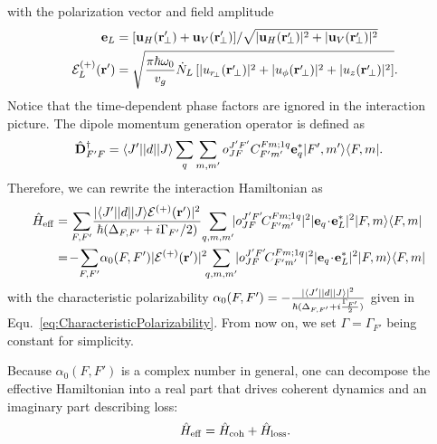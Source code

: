 with the polarization vector and field amplitude 
\begin{align}
\mathbf{e}_L &= [\mathbf{u}_H(\br'\!\!_\perp)+\mathbf{u}_V(\br'\!\!_\perp)]/\sqrt{|\mathbf{u}_H(\br'\!\!_\perp)|^2+|\mathbf{u}_V(\br'\!\!_\perp)|^2} \\
\mathcal{E}_L^{(+)} (\br') &= \sqrt{\frac{{\pi}\hbar\omega_0}{v_g}\dot{N}_L \left[ |u_{r\!_\perp}(\br'\!_\perp)|^2 + |u_\phi(\br'\!_\perp)|^2 +|u_z(\br'\!_\perp)|^2 \right]}.
\end{align}
Notice that the time-dependent phase factors are ignored in the interaction picture. 
The dipole momentum generation operator is defined as
\begin{align}
\hat{\mathbf{D}}_{F'F}^{\dagger} &= \langle{J'}\rvert| d |\lvert{J}\rangle\sum_{q}\sum_{m,m'} o^{J'F'}_{JF} C^{F m;1q}_{F' m'} \mathbf{e}_q^* \lvert{F',m'}\rangle\langle{F,m}\rvert.
\end{align}
Therefore, we can rewrite the interaction Hamiltonian as
\begin{align}
\!\!\!\!\!\!\hat{H}_{\rm eff} &= \sum_{F,F'} \! \frac{ |\bra{J'}| d |\ket{J} \mathcal{E}^{(+)}(\br')|^2}{\hbar(\Delta_{F,F'}+i\Gamma_{F'}/2)}\! \sum_{q,m,m'}\!\! |o^{J'F'}_{JF}\! C^{F m;1q}_{F' m'} |^2 |\mathbf{e}_q\!\cdot\! \mathbf{e}_L^*|^2\op{F,m}{F,m} \\
&= \!-\! \sum_{F,F'} \! \alpha_0(F,F')|\mathcal{E}^{(+)}(\br')|^2\!\! \sum_{q,m,m'}\!\! |o^{J'F'}_{JF}\! C^{F m;1q}_{F' m'} |^2 |\mathbf{e}_q\!\cdot\! \mathbf{e}_L^*|^2\op{F,m}{F,m}
\end{align}
with the characteristic polarizability $ \alpha_0(F,F')=- \frac{ |\langle{J'}\rvert| d |\lvert{J}\rangle|^2 }{\hbar (\Delta_{F,F'}+i\frac{\Gamma_{F'}}{2})} $ given in Equ.~\eqref{eq:CharacteristicPolarizability}. From now on, we set $ \Gamma=\Gamma_{F'} $ being constant for simplicity. 

Because $\alpha_0(F,F')$ is a complex number in general, one can decompose the effective Hamiltonian into a real part that drives coherent dynamics and an imaginary part describing loss:
\begin{align}
	\hat{H}_{\rm eff} = \hat{H}_{\rm coh} + \hat{H}_{\rm loss}.
\end{align}

